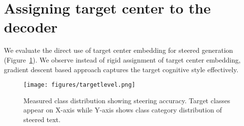 \section{Assigning target center to the decoder}
We evaluate the direct use of target center embedding for steered generation (Figure~\ref{fig:ltarget center}). We observe instead of rigid assignment of target center embedding, gradient descent based approach captures 
the target cognitive style effectively. 
\label{sec:tcd}
\begin{figure}[!ht]
\centering
\texttt{[image: figures/targetlevel.png]}
\caption{Measured class distribution showing steering accuracy. Target classes appear on X-axis while Y-axis shows class category distribution of steered text.}
\label{fig:ltarget center}
\end{figure}

